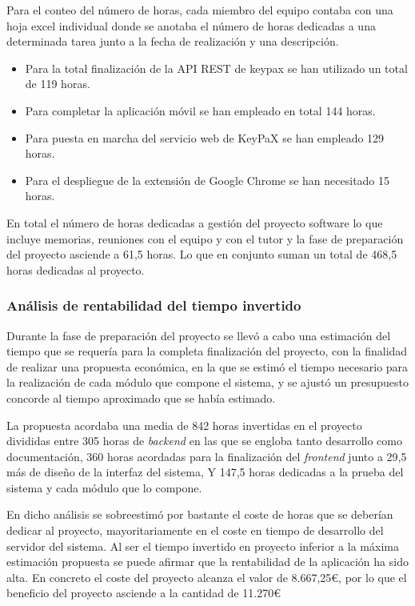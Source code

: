 \documentclass{article}
\begin{document}
Para el conteo del número de horas, cada miembro del equipo contaba con una hoja excel individual donde se anotaba el número de horas dedicadas a una determinada tarea junto a la fecha de realización y una descripción.

\begin{itemize}
  \item Para la total finalización de la API REST de keypax se han utilizado un total de 119 horas.
  \item Para completar la aplicación móvil se han empleado en total 144 horas.
  \item Para puesta en marcha del servicio web de KeyPaX se han empleado 129 horas.
  \item Para el despliegue de la extensión de Google Chrome se han necesitado 15 horas.
\end{itemize}

En total el número de horas dedicadas a gestión del proyecto software lo que incluye memorias, reuniones con el equipo y con el tutor y la fase de preparación del proyecto asciende a 61,5 horas. Lo que en conjunto suman un total de 468,5 horas dedicadas al proyecto.


\subsubsection*{Análisis de rentabilidad del tiempo invertido}

Durante la fase de preparación del proyecto se llevó a cabo una estimación del tiempo que se requería para la completa finalización del proyecto, con la finalidad de realizar una propuesta económica, en la que se estimó el tiempo necesario para la realización de cada módulo que compone el sistema, y se ajustó un presupuesto concorde al tiempo aproximado que se había estimado.

La propuesta acordaba una media de 842 horas invertidas en el proyecto divididas entre 305 horas de \textit{backend} en las que se engloba tanto desarrollo como documentación, 360 horas acordadas para la finalización del \textit{frontend} junto a 29,5 más de diseño de la interfaz del sistema, Y 147,5 horas dedicadas a la prueba del sistema y cada módulo que lo compone.

En dicho análisis se sobreestimó por bastante el coste de horas que se deberían dedicar al proyecto, mayoritariamente en el coste en tiempo de desarrollo del servidor del sistema. Al ser el tiempo invertido en proyecto inferior a la máxima estimación propuesta se puede afirmar que la rentabilidad de la aplicación ha sido alta. En concreto el coste del proyecto alcanza el valor de 8.667,25€, por lo que el beneficio del proyecto asciende a la cantidad de 11.270€
\end{document}
